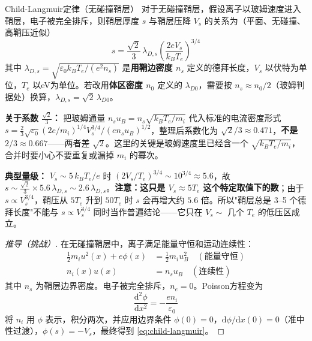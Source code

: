 \documentclass[12pt,a4paper,openany,oneside]{book}
\newcommand{\diff}{\mathrm{d}}
\newcommand{\eps}{\varepsilon}
\begin{document}
\begin{theorem}{Child-Langmuir定律（无碰撞鞘层）}{}{}
\label{thm:child-langmuir}
对于无碰撞鞘层，假设离子以玻姆速度进入鞘层，电子被完全排斥，则鞘层厚度 $s$ 与鞘层压降 $V_s$ 的关系为（平面、无碰撞、高鞘压近似）
\begin{equation}
\label{eq:child-langmuir}
s = \frac{\sqrt{2}}{3}\,\lambda_{D,s}\left(\frac{2eV_s}{k_BT_e}\right)^{3/4}
\end{equation}
其中 $\lambda_{D,s}=\sqrt{\eps_0k_BT_e/(e^2n_s)}$ 是\textbf{用鞘边密度 $n_s$} 定义的德拜长度，$V_s$ 以伏特为单位，$T_e$ 以eV为单位。若改用\textbf{体区密度 $n_0$} 定义的 $\lambda_{D0}$，需要按 $n_s\approx n_0/2$（玻姆判据处）换算，$\lambda_{D,s}=\sqrt2\,\lambda_{D0}$。

\textbf{关于系数 $\tfrac{\sqrt2}{3}$：} 把玻姆通量 $n_su_B=n_s\sqrt{k_BT_e/m_i}$ 代入标准的电流密度形式 $s=\frac{2}{3}\sqrt{\eps_0}(2e/m_i)^{1/4}V_s^{3/4}/(en_su_B)^{1/2}$，整理后系数化为 $\sqrt2/3\approx0.471$，\textbf{不是 $2/3\approx0.667$}——两者差 $\sqrt2$。这里的关键是玻姆速度里已经含一个 $\sqrt{k_BT_e/m_i}$，合并时要小心不要重复或漏掉 $m_i$ 的幂次。

\textbf{典型量级：} $V_s\sim5\,k_BT_e/e$ 时 $\left(2V_s/T_e\right)^{3/4}\sim10^{3/4}\approx5.6$，故 $s\sim\tfrac{\sqrt2}{3}\times5.6\,\lambda_{D,s}\sim2.6\,\lambda_{D,s}$。\textbf{注意：这只是 $V_s\approx5T_e$ 这个特定取值下的数}；由于 $s\propto V_s^{3/4}$，鞘压从 $5T_e$ 升到 $50T_e$ 时 $s$ 会再增大约 $5.6$ 倍。所以"鞘层总是 3--5 个德拜长度"不能与 $s\propto V_s^{3/4}$ 同时当作普遍结论——它只在 $V_s\sim$ 几个 $T_e$ 的低压区成立。
\end{theorem}

\begin{proof}[推导（挑战）]
在无碰撞鞘层中，离子满足能量守恒和运动连续性：
\begin{align}
\frac{1}{2}m_i u^2(x) + e\phi(x) &= \frac{1}{2}m_i u_B^2 \quad (\text{能量守恒}) \\
n_i(x) u(x) &= n_s u_B \quad (\text{连续性})
\label{eq:ch11-sheath-equations}
\end{align}
其中 $n_s$ 为鞘层边界密度。电子被完全排斥，$n_e = 0$。Poisson方程变为
\begin{equation}
\frac{\diff^2\phi}{\diff x^2} = -\frac{e n_i}{\eps_0}
\label{eq:ch11-sheath-poisson2}
\end{equation}
将 $n_i$ 用 $\phi$ 表示，积分两次，并应用边界条件 $\phi(0)=0$，$\diff\phi/\diff x(0)=0$（准中性过渡），$\phi(s)=-V_s$，最终得到 \cref{eq:child-langmuir}。
\end{proof}
\end{document}
